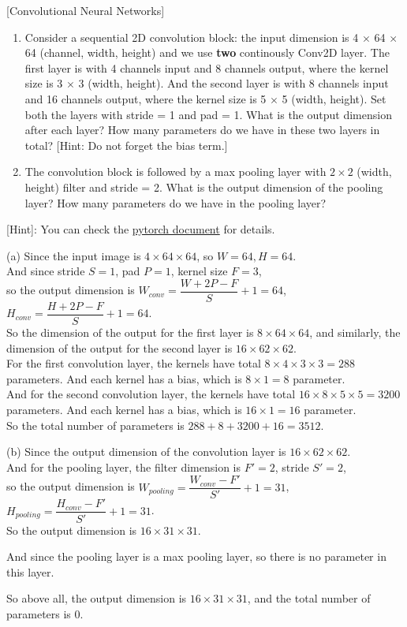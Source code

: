 \item {} [Convolutional Neural Networks]

\begin{enumerate}
    \item Consider a sequential 2D convolution block: the input dimension is 4 $\times$ 64 $\times$ 64 (channel, width, height) and we use \textbf{two} continously Conv2D layer. The first layer is with 4 channels input and 8 channels output, where the kernel size is 3 $\times$ 3 (width, height). And the second layer is with 8 channels input and 16 channels output, where the kernel size is 5 $\times$ 5 (width, height). Set both the layers with stride = 1 and pad = 1. What is the output dimension after each layer? How many parameters do we have in these two layers in total?  [Hint: Do not forget the bias term.]
    \item The convolution block is followed by a max pooling layer with $2\times 2$ (width, height) filter and stride
    = 2. What is the output dimension of the pooling layer? How many parameters do we have in the pooling
    layer? 
\end{enumerate}

[Hint]: You can check the \href{https://pytorch.org/docs/stable/nn.html#convolution-layers}{pytorch document} for details.

\solution

(a) Since the input image is $4\times 64\times 64$, so $W=64,H=64$. \\
And since stride $S=1$, pad $P=1$, kernel size $F=3$, \\
so the output dimension is $W_{conv}=\dfrac{W+2P-F}{S}+1=64$, $H_{conv}=\dfrac{H+2P-F}{S}+1=64$. \\
So the dimension of the output for the first layer is $8\times 64\times 64$, and similarly, the dimension of the output for the second layer is $16\times 62\times 62$. \\

For the first convolution layer, the kernels have total $8\times 4\times 3\times 3=288$ parameters. And each kernel has a bias, which is $8\times 1=8$ parameter.\\
And for the second convolution layer, the kernels have total $16\times 8\times 5\times 5=3200$ parameters. And each kernel has a bias, which is $16\times 1=16$ parameter.\\
So the total number of parameters is $288+8+3200+16=3512$.

(b) Since the output dimension of the convolution layer is $16\times 62\times 62$.\\
And for the pooling layer, the filter dimension is $F' = 2$, stride $S'=2$,\\
so the output dimension is $W_{pooling}=\dfrac{W_{conv}-F'}{S'}+1=31$, $H_{pooling}=\dfrac{H_{conv}-F'}{S'}+1=31$.\\
So the output dimension is $16\times 31\times 31$.

And since the pooling layer is a max pooling layer, so there is no parameter in this layer.

So above all, the output dimension is $16\times 31\times 31$, and the total number of parameters is $0$.

\newpage